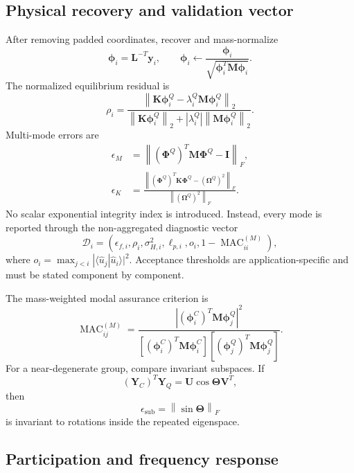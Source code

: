 \documentclass{ieeeaccess}
\newcommand{\M}{\mathbf{M}}
\newcommand{\K}{\mathbf{K}}
\newcommand{\I}{\mathbf{I}}
\newcommand{\PhiM}{\boldsymbol{\Phi}}
\newcommand{\ph}{\boldsymbol{\phi}}
\newcommand{\yy}{\mathbf{y}}
\newcommand{\norm}[1]{\left\lVert #1\right\rVert}
\newcommand{\MAC}{\operatorname{MAC}}
\begin{document}
\subsection{Physical recovery and validation vector}

After removing padded coordinates, recover and mass-normalize
\begin{equation}
\ph_i=\mathbf L^{-T}\yy_i,
\qquad
\ph_i\leftarrow\frac{\ph_i}{\sqrt{\ph_i^T\M\ph_i}}.
\label{eq:recover}
\end{equation}
The normalized equilibrium residual is
\begin{equation}
\rho_i=
\frac{\norm{\K\ph_i^Q-\lambda_i^Q\M\ph_i^Q}_2}
{\norm{\K\ph_i^Q}_2+|\lambda_i^Q|\norm{\M\ph_i^Q}_2}.
\label{eq:residual}
\end{equation}
Multi-mode errors are
\begin{align}
\epsilon_M&=\norm{(\PhiM^Q)^T\M\PhiM^Q-\I}_F,\label{eq:em}\\
\epsilon_K&=\frac{\norm{(\PhiM^Q)^T\K\PhiM^Q-(\boldsymbol\Omega^Q)^2}_F}
{\norm{(\boldsymbol\Omega^Q)^2}_F}.\label{eq:ek}
\end{align}
No scalar exponential integrity index is introduced. Instead, every mode is reported through the non-aggregated diagnostic vector
\begin{equation}
\boxed{
\mathcal D_i=
(\epsilon_{f,i},\rho_i,\sigma_{H,i}^2,\ell_{p,i},o_i,1-\MAC_{ii}^{(M)}),
}
\label{eq:diagnosticvector}
\end{equation}
where $o_i=\max_{j<i}|\langle\widehat u_j|\widehat u_i\rangle|^2$. Acceptance thresholds are application-specific and must be stated component by component.

The mass-weighted modal assurance criterion is \cite{Allemang1982}
\begin{equation}
\MAC_{ij}^{(M)}=
\frac{|(\ph_i^C)^T\M\ph_j^Q|^2}
{[(\ph_i^C)^T\M\ph_i^C][(\ph_j^Q)^T\M\ph_j^Q]}.
\label{eq:mac}
\end{equation}
For a near-degenerate group, compare invariant subspaces. If
\begin{equation}
(\mathbf Y_C)^T\mathbf Y_Q=\mathbf U\cos\boldsymbol\Theta\mathbf V^T,
\end{equation}
then
\begin{equation}
\epsilon_{\mathrm{sub}}=\norm{\sin\boldsymbol\Theta}_F
\label{eq:subspace}
\end{equation}
is invariant to rotations inside the repeated eigenspace.

\subsection{Participation and frequency response}
\end{document}
